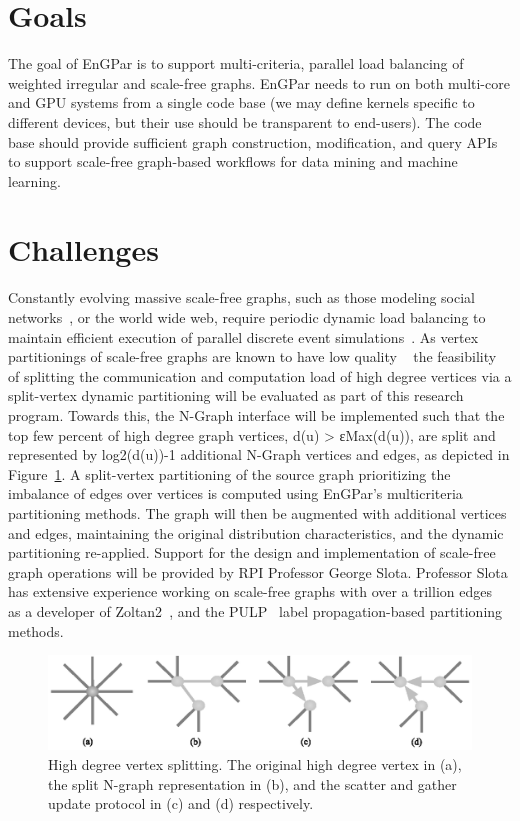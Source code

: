 \documentclass{article}
\begin{document}
\section{Goals}

The goal of EnGPar is to support multi-criteria, parallel
load balancing of weighted irregular and scale-free graphs.
EnGPar needs to run on both multi-core and GPU systems from a single code base
(we may define kernels specific to different devices, but their use should be
transparent to end-users).
The code base should provide sufficient graph construction, modification, and
query APIs to support scale-free graph-based workflows for data mining and
machine learning.

\section{Challenges}

Constantly evolving massive scale-free graphs, such as those modeling social
networks~\cite{twitter2010,kwak2010twitter}, or the world wide web, require
periodic dynamic load balancing to maintain efficient execution of parallel
discrete event simulations~\cite{carothers2002ross}.
As vertex partitionings of scale-free graphs are known to have low quality
~\cite{abou2006multilevel,lang2004finding,leskovec2009community,pienta2013parallel}
the feasibility of splitting the communication and computation load of high
degree vertices via a split-vertex dynamic partitioning will be evaluated as
part of this research program.
Towards this, the N-Graph interface will be implemented such
that the top few percent of high degree graph vertices, d(u) > εMax(d(u)), are
split and represented by log2(d(u))-1 additional N-Graph vertices and edges, as
depicted in Figure~\ref{fig:vtxSplitting}.
A split-vertex partitioning of the source graph prioritizing the imbalance of
edges over vertices is computed using EnGPar’s multicriteria partitioning
methods.
The graph will then be augmented with additional vertices and edges,
maintaining the original distribution characteristics, and the dynamic
partitioning re-applied.
Support for the design and implementation of scale-free graph operations will be
provided by RPI Professor George Slota.
Professor Slota has extensive experience working on scale-free graphs with over
a trillion edges~\cite{slota_ipdps2017} as a developer of Zoltan2~\cite{zoltan2}, and the
PULP~\cite{slota_ipdps2017} label propagation-based partitioning methods.

\begin{figure}
  \includegraphics[width=\textwidth]{../ngraph/vtxSplitting.eps}
  \caption{\label{fig:vtxSplitting}
    High degree vertex splitting. 
    The original high degree vertex in (a), the split N-graph representation in
    (b), and the scatter and gather update protocol in (c) and (d) respectively.
  }
\end{figure}
\end{document}
